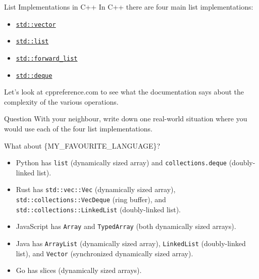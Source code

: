 \documentclass{algo}
\begin{document}
\begin{frame}{List Implementations in C++}
    In C++ there are four main list implementations:

    \begin{itemize}
        \item \href{https://en.cppreference.com/w/cpp/container/vector}{\texttt{std::vector}}
        \item \href{https://en.cppreference.com/w/cpp/container/list}{\texttt{std::list}}
        \item \href{https://en.cppreference.com/w/cpp/container/forward_list}{\texttt{std::forward\_list}}
        \item \href{https://en.cppreference.com/w/cpp/container/deque}{\texttt{std::deque}}
    \end{itemize}

    Let's look at cppreference.com to see what the documentation says about the
    complexity of the various operations.

    \pause

    \begin{block}{Question}
        With your neighbour, write down one real-world situation where you would
        use each of the four list implementations.
    \end{block}
\end{frame}

\begin{frame}{What about \{MY\_FAVOURITE\_LANGUAGE\}?}
    \begin{itemize}
        \item Python has \texttt{list} (dynamically sized array) and
            \texttt{collections.deque} (doubly-linked list).
        \item Rust has \texttt{std::vec::Vec} (dynamically sized array),
            \texttt{std::collections::VecDeque} (ring buffer), and
            \texttt{std::collections::LinkedList} (doubly-linked list).
        \item JavaScript has \texttt{Array} and \texttt{TypedArray} (both
            dynamically sized arrays).
        \item Java has \texttt{ArrayList} (dynamically sized array),
            \texttt{LinkedList} (doubly-linked list), and
            \texttt{Vector} (synchronized dynamically sized array).
        \item Go has slices (dynamically sized arrays).
    \end{itemize}
\end{frame}
\end{document}
